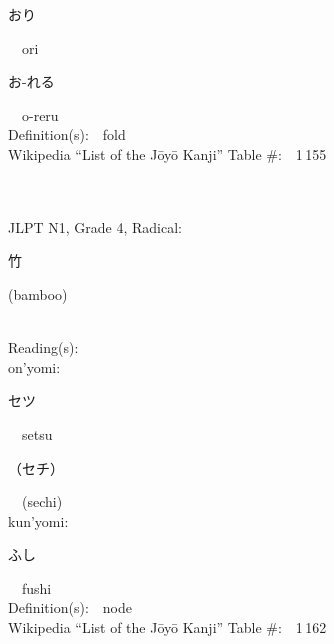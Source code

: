 \begin{multicols}{2}
{\hspace*{2em}}{\begin{CJK}{UTF8}{min} おり \end{CJK}}\ \ ori\ \ \\
{\hspace*{2em}}{\begin{CJK}{UTF8}{min} お-れる \end{CJK}}\ \ o-reru\ \ \\
Definition(s):\ \ fold \\
Wikipedia ``List of the J\=oy\=o Kanji'' Table \#:\ \ 1\,155 \\
\ \ \\
{\fontsize{34pt}{40pt}  }\ \ \\  %
{JLPT N1, Grade 4, Radical:\ \ {\begin{CJK}{UTF8}{min} 竹 \end{CJK}} (bamboo) } \\
Reading(s):\ \ \\
{\hspace*{1em}}on'yomi:\ \ \\
{\hspace*{2em}}{\begin{CJK}{UTF8}{min} セツ \end{CJK}}\ \ setsu\ \ \\
{\hspace*{2em}}{\begin{CJK}{UTF8}{min} （セチ） \end{CJK}}\ \ (sechi)\ \ \\
{\hspace*{1em}}kun'yomi:\ \ \\
{\hspace*{2em}}{\begin{CJK}{UTF8}{min} ふし \end{CJK}}\ \ fushi\ \ \\
Definition(s):\ \ node \\
Wikipedia ``List of the J\=oy\=o Kanji'' Table \#:\ \ 1\,162 \\
\ \ \\
{\fontsize{34pt}{40pt}  }\ \ \\  %

\end{multicols}
